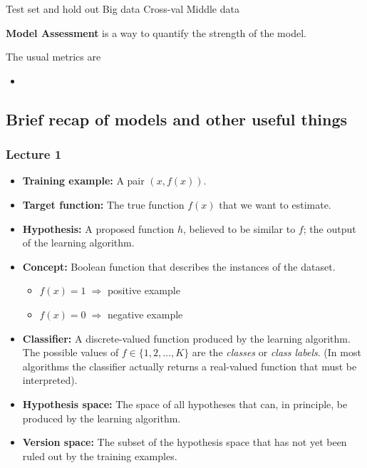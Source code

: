 \vspace{10pt}

Test set and hold out \ra Big data
Cross-val \ra Middle data



\textbf{Model Assessment} is a way to quantify the strength of the model.

The usual metrics are

\begin{itemize}
    \item 
\end{itemize}










\subsection{Brief recap of models and other useful things}

\subsubsection{Lecture 1}

\begin{itemize}
    \item \textbf{Training example:} A pair $(x, f(x))$.
    \item \textbf{Target function:} The true function $f(x)$ that we want to estimate.
    \item \textbf{Hypothesis:} A proposed function $h$, believed to be similar to $f$; the output of the learning algorithm.
    \item \textbf{Concept:} Boolean function that describes the instances of the dataset.
          \begin{itemize}
              \item $f(x) = 1 \;\Rightarrow$ positive example
              \item $f(x) = 0 \;\Rightarrow$ negative example 
          \end{itemize}
    \item \textbf{Classifier:} A discrete-valued function produced by the learning algorithm.  
          The possible values of $f \in \{1,2,\dots,K\}$ are the \emph{classes} or \emph{class labels}.  
          (In most algorithms the classifier actually returns a real-valued function that must be interpreted).
    \item \textbf{Hypothesis space:} The space of all hypotheses that can, in principle, be produced by the learning algorithm.
    \item \textbf{Version space:} The subset of the hypothesis space that has not yet been ruled out by the training examples.
\end{itemize}


